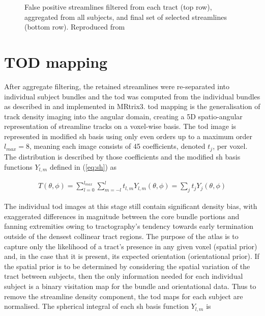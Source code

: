 \begin{figure}
  \caption{False positive streamlines filtered from each tract (top row), aggregated from all subjects, and final set of selected streamlines (bottom row). Reproduced from \textcite{Young2024}}\label{fig:filter}
\end{figure}


\section{TOD mapping}

After aggregate filtering, the retained streamlines were re-separated into individual subject bundles and the \gls{tod} was computed from the individual bundles as described in \textcite{Dhollander2014} and implemented in MRtrix3. \autocite{Tournier2019}
\gls{tod} mapping is the generalisation of track density imaging into the angular domain, creating a 5D spatio-angular representation of streamline tracks on a voxel-wise basis.
The \gls{tod} image is represented in modified \gls{sh} basis \autocite{Descoteaux2006} using only even orders up to a maximum order $l_{max}=8$, meaning each image consists of 45 coefficients, denoted $t_j$, per voxel.
The distribution is described by those coefficients and the modified \gls{sh} basis functions $Y_{l,m}$ defined in (\ref{eq:sh}) \autocite{Descoteaux2006} as

\begin{align}
  T(\theta, \phi) = \sum_{l=0}^{l_{max}} \sum_{m=-l}^l t_{l,m} Y_{l,m}(\theta, \phi) = \sum_j t_jY_j(\theta, \phi)
\end{align}

The individual \gls{tod} images at this stage still contain significant density bias, with exaggerated differences in magnitude between the core bundle portions and fanning extremities owing to tractography's tendency towards early termination outside of the densest collinear tract regions.\autocite{Smith2013,Calamante2015,Rheault2020}
The purpose of the atlas is to capture only the likelihood of a tract's presence in any given voxel (spatial prior) and, in the case that it is present, its expected orientation (orientational prior).
If the spatial prior is to be determined by considering the spatial variation of the tract between subjects, then the only information needed for each individual subject is a binary visitation map for the bundle and orientational data.
Thus to remove the streamline density component, the \gls{tod} maps for each subject are normalised.
The spherical integral of each \gls{sh} basis function $Y_{l,m}$ is

